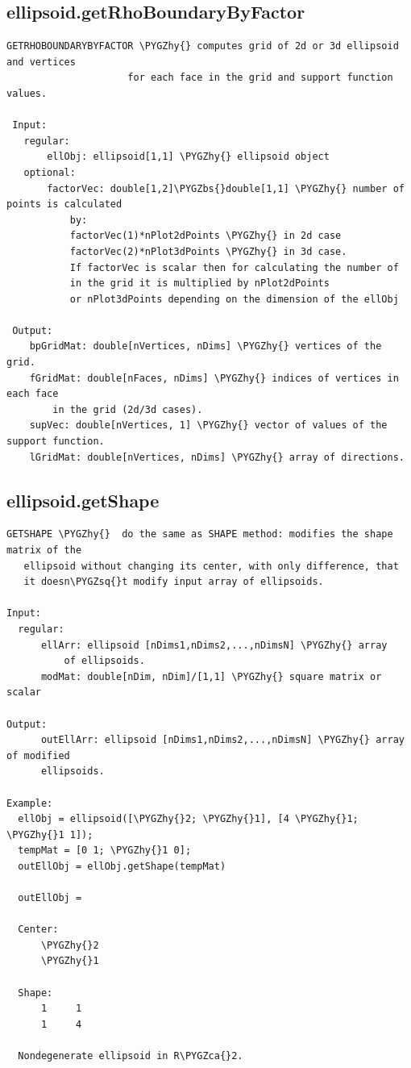 \documentclass[letterpaper,10pt,english]{sphinxmanual}
\def\PYGZbs{\char`\\}
\def\PYGZca{\char`\^}
\def\PYGZhy{\char`\-}
\def\PYGZsq{\char`\'}
\begin{document}
\subsection{ellipsoid.getRhoBoundaryByFactor}
\label{chap_functions:ellipsoid-getrhoboundarybyfactor}
\begin{Verbatim}[commandchars=\\\{\}]
GETRHOBOUNDARYBYFACTOR \PYGZhy{} computes grid of 2d or 3d ellipsoid and vertices
                     for each face in the grid and support function values.

 Input:
   regular:
       ellObj: ellipsoid[1,1] \PYGZhy{} ellipsoid object
   optional:
       factorVec: double[1,2]\PYGZbs{}double[1,1] \PYGZhy{} number of points is calculated
           by:
           factorVec(1)*nPlot2dPoints \PYGZhy{} in 2d case
           factorVec(2)*nPlot3dPoints \PYGZhy{} in 3d case.
           If factorVec is scalar then for calculating the number of
           in the grid it is multiplied by nPlot2dPoints
           or nPlot3dPoints depending on the dimension of the ellObj

 Output:
    bpGridMat: double[nVertices, nDims] \PYGZhy{} vertices of the grid.
    fGridMat: double[nFaces, nDims] \PYGZhy{} indices of vertices in each face
        in the grid (2d/3d cases).
    supVec: double[nVertices, 1] \PYGZhy{} vector of values of the support function.
    lGridMat: double[nVertices, nDims] \PYGZhy{} array of directions.
\end{Verbatim}


\subsection{ellipsoid.getShape}
\label{chap_functions:ellipsoid-getshape}
\begin{Verbatim}[commandchars=\\\{\}]
GETSHAPE \PYGZhy{}  do the same as SHAPE method: modifies the shape matrix of the
   ellipsoid without changing its center, with only difference, that
   it doesn\PYGZsq{}t modify input array of ellipsoids.

Input:
  regular:
      ellArr: ellipsoid [nDims1,nDims2,...,nDimsN] \PYGZhy{} array
          of ellipsoids.
      modMat: double[nDim, nDim]/[1,1] \PYGZhy{} square matrix or scalar

Output:
      outEllArr: ellipsoid [nDims1,nDims2,...,nDimsN] \PYGZhy{} array of modified
      ellipsoids.

Example:
  ellObj = ellipsoid([\PYGZhy{}2; \PYGZhy{}1], [4 \PYGZhy{}1; \PYGZhy{}1 1]);
  tempMat = [0 1; \PYGZhy{}1 0];
  outEllObj = ellObj.getShape(tempMat)

  outEllObj =

  Center:
      \PYGZhy{}2
      \PYGZhy{}1

  Shape:
      1     1
      1     4

  Nondegenerate ellipsoid in R\PYGZca{}2.
\end{Verbatim}
\end{document}
